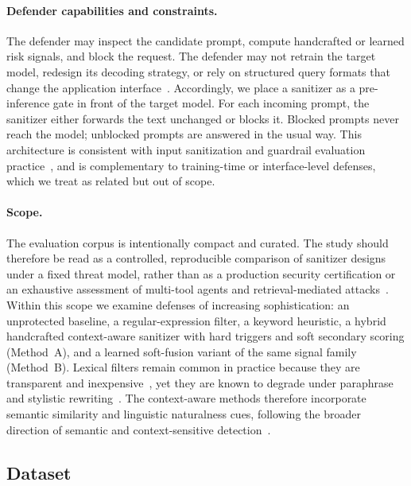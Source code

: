 \documentclass{article}
\begin{document}
\paragraph{Defender capabilities and constraints.}
The defender may inspect the candidate prompt, compute handcrafted or learned risk signals, and block the request.
The defender may not retrain the target model, redesign its decoding strategy, or rely on structured query formats that change the application interface~\cite{struq2024,secalign2024}.
Accordingly, we place a sanitizer as a pre-inference gate in front of the target model.
For each incoming prompt, the sanitizer either forwards the text unchanged or blocks it.
Blocked prompts never reach the model; unblocked prompts are answered in the usual way.
This architecture is consistent with input sanitization and guardrail evaluation practice~\cite{chowdhury2025prepsilonepsilonmptsanitizingsensitiveprompts,geng2025pisanitizer,shi2025promptarmor,zizzo2025adversarial}, and is complementary to training-time or interface-level defenses, which we treat as related but out of scope.

\paragraph{Scope.}
The evaluation corpus is intentionally compact and curated.
The study should therefore be read as a controlled, reproducible comparison of sanitizer designs under a fixed threat model, rather than as a production security certification or an exhaustive assessment of multi-tool agents and retrieval-mediated attacks~\cite{debenedetti2024agentdojo,greshake2023indirect}.
Within this scope we examine defenses of increasing sophistication: an unprotected baseline, a regular-expression filter, a keyword heuristic, a hybrid handcrafted context-aware sanitizer with hard triggers and soft secondary scoring (Method~A), and a learned soft-fusion variant of the same signal family (Method~B).
Lexical filters remain common in practice because they are transparent and inexpensive~\cite{openrouter2026promptinjection,getstream2024prompt,mend2024prompt}, yet they are known to degrade under paraphrase and stylistic rewriting~\cite{yi2024jailbreak,wang2025promptsleuth}.
The context-aware methods therefore incorporate semantic similarity and linguistic naturalness cues, following the broader direction of semantic and context-sensitive detection~\cite{wang2025promptsleuth,kholkar2025capture,bair2025prompt}.

\subsection{Dataset}
\label{sec:dataset}
\end{document}

